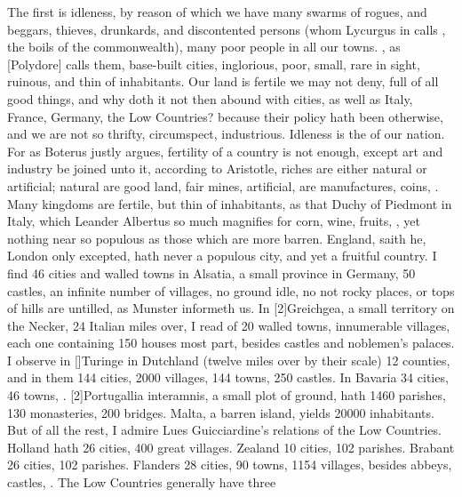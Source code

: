 The first is idleness, by reason of which we have many swarms of
rogues, and beggars, thieves, drunkards, and discontented persons (whom
Lycurgus in  calls , the boils of the
commonwealth), many poor people in all our towns. ,
as [Polydore] calls them, base-built cities, inglorious, poor,
small, rare in sight, ruinous, and thin of inhabitants. Our land is
fertile we may not deny, full of all good things, and why doth it not
then abound with cities, as well as Italy, France, Germany, the Low
Countries? because their policy hath been otherwise, and we are not so
thrifty, circumspect, industrious. Idleness is the  of our
nation. For as Boterus justly argues, fertility of a country is
not enough, except art and industry be joined unto it, according to
Aristotle, riches are either natural or artificial; natural are good
land, fair mines, \etc{} artificial, are manufactures, coins, \etc{}. Many
kingdoms are fertile, but thin of inhabitants, as that Duchy of
Piedmont in Italy, which Leander Albertus so much magnifies for corn,
wine, fruits, \etc{}, yet nothing near so populous as those which are more
barren. England, saith he, London only excepted, hath never a
populous city, and yet a fruitful country. I find 46 cities and walled
towns in Alsatia, a small province in Germany, 50 castles, an infinite
number of villages, no ground idle, no not rocky places, or tops of
hills are untilled, as Munster informeth us. In [2\baselineskip]Greichgea, a
small territory on the Necker, 24 Italian miles over, I read of 20
walled towns, innumerable villages, each one containing 150 houses most
part, besides castles and noblemen's palaces. I observe in [\baselineskip]Turinge
in Dutchland (twelve miles over by their scale) 12 counties, and in
them 144 cities, 2000 villages, 144 towns, 250 castles. In Bavaria
34 cities, 46 towns, \etc{}. [2\baselineskip]Portugallia interamnis, a small plot of
ground, hath 1460 parishes, 130 monasteries, 200 bridges. Malta, a
barren island, yields 20\thinspace{}000 inhabitants. But of all the rest, I admire
Lues Guicciardine's relations of the Low Countries. Holland hath 26
cities, 400 great villages. Zealand 10 cities, 102 parishes. Brabant 26
cities, 102 parishes. Flanders 28 cities, 90 towns, 1154 villages,
besides abbeys, castles, \etc{}. The Low Countries generally have three

